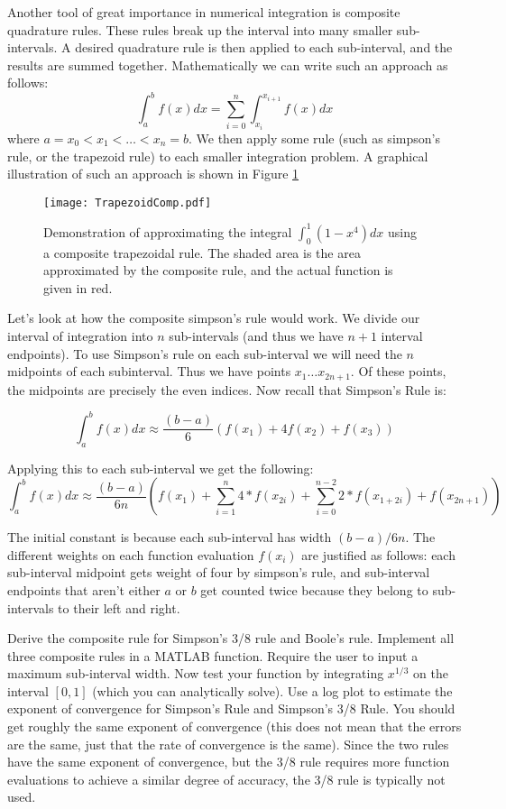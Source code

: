 Another tool of great importance in numerical integration is composite quadrature rules. These rules break up the interval into many smaller sub-intervals. A desired quadrature rule is then applied to each sub-interval, and the results are summed together. Mathematically we can write such an approach as follows:
\[
\int_a^b f(x) dx = \sum_{i=0}^n \int_{x_i}^{x_{i+1}} f(x) dx
\]
where $a = x_0 < x_1 < \ldots < x_n = b$. We then apply some rule (such as simpson's rule, or the trapezoid rule) to each smaller integration problem. A graphical illustration of such an approach is shown in Figure \ref{Fig:TrapezoidalComposite}

\begin{figure}
\begin{center}
\texttt{[image: TrapezoidComp.pdf]}
\caption{Demonstration of approximating the integral $\int_0^1 (1-x^4)dx$ using a composite trapezoidal rule. The shaded area is the area approximated by the composite rule, and the actual function is given in red.}
\label{Fig:TrapezoidalComposite}
\end{center}
\end{figure}

Let's look at how the composite simpson's rule would work. We divide our interval of integration into $n$ sub-intervals (and thus we have $n+1$ interval endpoints). To use Simpson's rule on each sub-interval we will need the $n$ midpoints of each subinterval. Thus we have points $x_1 \ldots x_{2n+1}$. Of these points, the midpoints are precisely the even indices. Now recall that Simpson's Rule is:

\[
\int_a^b f(x) dx \approx \frac{(b-a)}{6}\left(f(x_1) + 4 f(x_2) + f(x_3)\right)
\]

Applying this to each sub-interval we get the following:
\[
\int_a^b f(x) dx \approx \frac{(b-a)}{6n}\left( f(x_1) + \sum_{i=1}^{n} 4*f(x_{2i}) + \sum_{i=0}^{n-2} 2*f(x_{1+2i}) + f(x_{2n+1})\right)
\]

The initial constant is because each sub-interval has width $(b-a)/6n$. The different weights on each function evaluation $f(x_i)$ are justified as follows: each sub-interval midpoint gets weight of four by simpson's rule, and sub-interval endpoints that aren't either $a$ or $b$ get counted twice because they belong to sub-intervals to their left and right.

\begin{problem}
Derive the composite rule for Simpson's 3/8 rule and Boole's rule. Implement all three composite rules in a MATLAB function. Require the user to input a maximum sub-interval width. Now test your function by integrating $x^{1/3}$ on the interval $[0,1]$ (which you can analytically solve). Use a log plot to estimate the exponent of convergence for Simpson's Rule and Simpson's 3/8 Rule. You should get roughly the same exponent of convergence (this does not mean that the errors are the same, just that the rate of convergence is the same). Since the two rules have the same exponent of convergence, but the 3/8 rule requires more function evaluations to achieve a similar degree of accuracy, the 3/8 rule is typically not used.
\end{problem}

